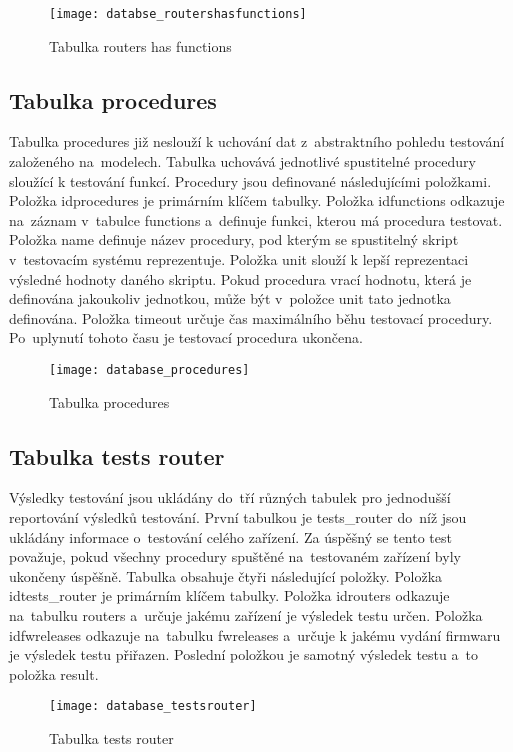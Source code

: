 \begin{figure}[h]
  \centering
  \texttt{[image: databse\_routershasfunctions]}
  \caption{Tabulka routers has functions}
  \label{fig:databse_routershasfunctions}
\end{figure}

\subsection{Tabulka procedures}
Tabulka procedures již neslouží k uchování dat z~abstraktního pohledu testování založeného na~modelech. Tabulka uchovává jednotlivé spustitelné procedury sloužící k testování funkcí. Procedury jsou definované následujícími položkami. Položka idprocedures je primárním klíčem tabulky. Položka idfunctions odkazuje na~záznam v~tabulce functions a~definuje funkci, kterou má procedura testovat. Položka name definuje název procedury, pod kterým se spustitelný skript v~testovacím systému reprezentuje. Položka unit slouží k lepší reprezentaci výsledné hodnoty daného skriptu. Pokud procedura vrací hodnotu, která je definována jakoukoliv jednotkou, může být v~položce unit tato jednotka definována. Položka timeout určuje čas maximálního běhu testovací procedury. Po~uplynutí tohoto času je testovací procedura ukončena.

\begin{figure}[h]
  \centering
  \texttt{[image: database\_procedures]}
  \caption{Tabulka procedures}
  \label{fig:database_procedures}
\end{figure}

\subsection{Tabulka tests router}
Výsledky testování jsou ukládány do~tří různých tabulek pro jednodušší reportování výsledků testování. První tabulkou je tests\_router do~níž jsou ukládány informace o~testování celého zařízení. Za úspěšný se tento test považuje, pokud všechny procedury spuštěné na~testovaném zařízení byly ukončeny úspěšně. Tabulka obsahuje čtyři následující položky. Položka idtests\_router je primárním klíčem tabulky. Položka idrouters odkazuje na~tabulku routers a~určuje jakému zařízení je výsledek testu určen. Položka idfwreleases odkazuje na~tabulku fwreleases a~určuje k jakému vydání firmwaru je výsledek testu přiřazen. Poslední položkou je samotný výsledek testu a~to položka result.

\begin{figure}[h]
  \centering
  \texttt{[image: database\_testsrouter]}
  \caption{Tabulka tests router}
  \label{fig:database_testsrouter}
\end{figure}

